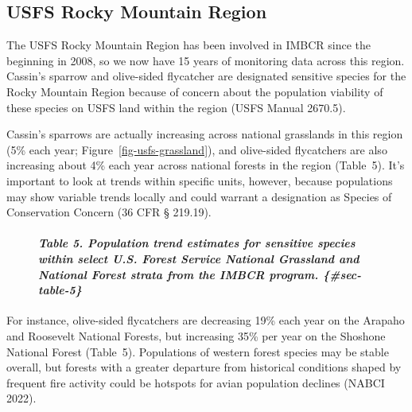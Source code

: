 \documentclass[
  letterpaper,
  DIV=11,
  numbers=noendperiod,
  oneside]{scrreprt}
\let\oldparagraph\paragraph
\renewcommand{\paragraph}[1]{\oldparagraph{#1}\mbox{}}
\begin{document}
\hypertarget{usfs-rocky-mountain-region}{%
\subsection{USFS Rocky Mountain
Region}\label{usfs-rocky-mountain-region}}

The USFS Rocky Mountain Region has been involved in IMBCR since the
beginning in 2008, so we now have 15 years of monitoring data across
this region. Cassin's sparrow and olive-sided flycatcher are designated
sensitive species for the Rocky Mountain Region because of concern about
the population viability of these species on USFS land within the region
(USFS Manual 2670.5).

Cassin's sparrows are actually increasing across national grasslands in
this region (5\% each year; Figure~\ref{fig-usfs-grassland}), and
olive-sided flycatchers are also increasing about 4\% each year across
national forests in the region (Table~{5}). It's important to look at
trends within specific units, however, because populations may show
variable trends locally and could warrant a designation as Species of
Conservation Concern (36 CFR § 219.19).

\begin{figure}

\hypertarget{table-5.-population-trend-estimates-for-sensitive-species-within-select-u.s.-forest-service-national-grassland-and-national-forest-strata-from-the-imbcr-program.-sec-table-5}{%
\paragraph{\texorpdfstring{\emph{Table 5. Population trend estimates for
sensitive species within select U.S. Forest Service National Grassland
and National Forest strata from the IMBCR program.
\{\#sec-table-5\}}}{Table 5. Population trend estimates for sensitive species within select U.S. Forest Service National Grassland and National Forest strata from the IMBCR program. \{\#sec-table-5\}}}\label{table-5.-population-trend-estimates-for-sensitive-species-within-select-u.s.-forest-service-national-grassland-and-national-forest-strata-from-the-imbcr-program.-sec-table-5}}

\end{figure}

For instance, olive-sided flycatchers are decreasing 19\% each year on
the Arapaho and Roosevelt National Forests, but increasing 35\% per year
on the Shoshone National Forest (Table~{5}). Populations of western
forest species may be stable overall, but forests with a greater
departure from historical conditions shaped by frequent fire activity
could be hotspots for avian population declines (NABCI 2022).
\end{document}
